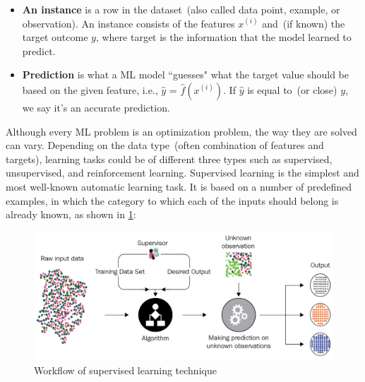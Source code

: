 \begin{itemize}[noitemsep]
    \item \textbf{An instance} is a row in the dataset~(also called data point, example, or observation). An instance consists of the features $x^{(i)}$ and~(if known) the target outcome ${y}$, where target is the information that the model learned to predict.

    \item \textbf{Prediction} is what a ML model ``guesses" what the target value should be based on the given feature, i.e., $\hat{y}$ = $\hat{f}\left(x^{(i)}\right)$. If $\hat{y}$ is equal to~(or close) ${y}$, we say it's an accurate prediction.   
\end{itemize}

\hspace*{3.5mm} Although every ML problem is an optimization problem, the way they are solved can vary. Depending on the data type~(often combination of features and targets), learning tasks could be of different three types such as supervised, unsupervised, and reinforcement learning. Supervised learning is the simplest and most well-known automatic learning task. It is based on a number of predefined examples, in which the category to which each of the inputs should belong is already known, as shown in \cref{fig:ml_pipeline_sup}:

\begin{figure}[h]
	\centering
	\includegraphics[scale=0.7]{images/sup.png}
	\caption{Workflow of supervised learning technique~\cite{karimScalaML2019}} 
	\label{fig:ml_pipeline_sup}
\end{figure}

